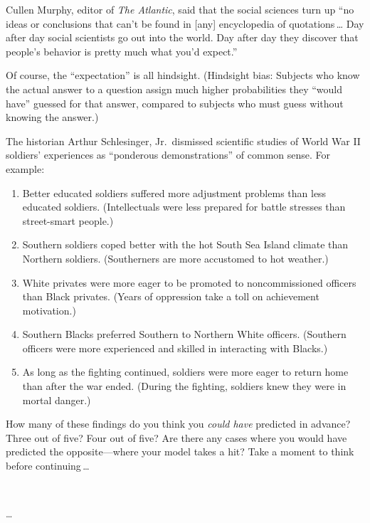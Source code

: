 {
 Cullen Murphy, editor of \textit{The Atlantic}, said that the
social sciences turn up ``no ideas or conclusions that
can't be found in [any] encyclopedia of quotations\,\ldots
Day after day social scientists go out into the world. Day after
day they discover that people's behavior is pretty much
what you'd expect.''}

{
 Of course, the ``expectation''
is all hindsight. (Hindsight bias: Subjects who know the actual answer
to a question assign much higher probabilities they
``would have'' guessed for that
answer, compared to subjects who must guess without knowing the
answer.)}

{
 The historian Arthur Schlesinger, Jr.\ dismissed scientific studies
of World War II soldiers' experiences as
``ponderous demonstrations'' of
common sense. For example:}

\begin{enumerate}
\item {
 Better educated soldiers suffered more adjustment problems than
less educated soldiers. (Intellectuals were less prepared for battle
stresses than street-smart people.)}

\item {
 Southern soldiers coped better with the hot South Sea Island
climate than Northern soldiers. (Southerners are more accustomed to hot
weather.)}

\item {
 White privates were more eager to be promoted to noncommissioned
officers than Black privates. (Years of oppression take a toll on
achievement motivation.)}

\item {
 Southern Blacks preferred Southern to Northern White officers.
(Southern officers were more experienced and skilled in interacting
with Blacks.)}

\item {
 As long as the fighting continued, soldiers were more eager to
return home than after the war ended. (During the fighting, soldiers
knew they were in mortal danger.)}
\end{enumerate}

{
 How many of these findings do you think you \textit{could have}
predicted in advance? Three out of five? Four out of five? Are there
any cases where you would have predicted the opposite---where your
model takes a hit? Take a moment to think before continuing\,\ldots}

{
 ~}

{
 \ldots}

